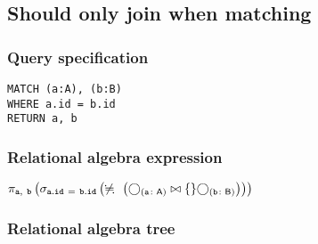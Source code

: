 
\subsection{Should only join when matching}

\subsubsection*{Query specification}

\begin{lstlisting}
MATCH (a:A), (b:B)
WHERE a.id = b.id
RETURN a, b
\end{lstlisting}

\subsubsection*{Relational algebra expression}

$\projection{\var{a},~\var{b}} \left(\selection{\mathtt{a.id~=~b.id}} \left(\alldifferent{} \left(\getvertices{a}{A} \join \{\} \getvertices{b}{B}\right)\right)\right)$

\subsubsection*{Relational algebra tree}


